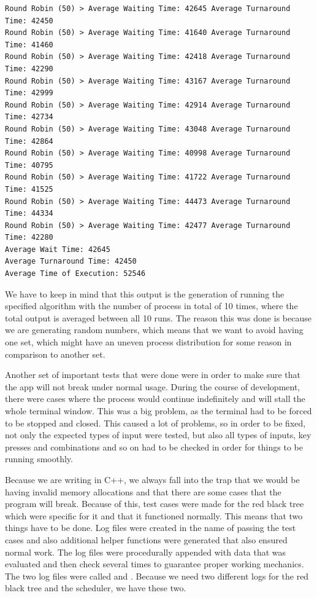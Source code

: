 \documentclass{article}
\newcommand{\code}[1]{\codeinline{\texttt{#1}}}
\begin{document}
\begin{lstlisting}
Round Robin (50) > Average Waiting Time: 42645 Average Turnaround Time: 42450
Round Robin (50) > Average Waiting Time: 41640 Average Turnaround Time: 41460
Round Robin (50) > Average Waiting Time: 42418 Average Turnaround Time: 42290
Round Robin (50) > Average Waiting Time: 43167 Average Turnaround Time: 42999
Round Robin (50) > Average Waiting Time: 42914 Average Turnaround Time: 42734
Round Robin (50) > Average Waiting Time: 43048 Average Turnaround Time: 42864
Round Robin (50) > Average Waiting Time: 40998 Average Turnaround Time: 40795
Round Robin (50) > Average Waiting Time: 41722 Average Turnaround Time: 41525
Round Robin (50) > Average Waiting Time: 44473 Average Turnaround Time: 44334
Round Robin (50) > Average Waiting Time: 42477 Average Turnaround Time: 42280
Average Wait Time: 42645
Average Turnaround Time: 42450
Average Time of Execution: 52546
\end{lstlisting}

We have to keep in mind that this output is the generation of running the specified algorithm with the number of process in total of 10 times, where the total output is averaged between all 10 runs. The reason this was done is because we are generating random numbers, which means that we want to avoid having one set, which might have an uneven process distribution for some reason in comparison to another set.

Another set of important tests that were done were in order to make sure that the app will not break under normal usage. During the course of development, there were cases where the process would continue indefinitely and will stall the whole terminal window. This was a big problem, as the terminal had to be forced to be stopped and closed. This caused a lot of problems, so in order to be fixed, not only the expected types of input were tested, but also all types of inputs, key presses and combinations and so on had to be checked in order for things to be running smoothly.

Because we are writing in C++, we always fall into the trap that we would be having invalid memory allocations and that there are some cases that the program will break. Because of this, test cases were made for the red black tree which were specific for it and that it functioned normally. This means that two things have to be done. Log files were created in the name of passing the test cases and also additional helper functions were generated that also ensured normal work. The log files were procedurally appended with data that was evaluated and then check several times to guarantee proper working mechanics. The two log files were called \code{log\_file.txt} and \code{log\_rbt.txt}. Because we need two different logs for the red black tree and the scheduler, we have these two.
\end{document}
